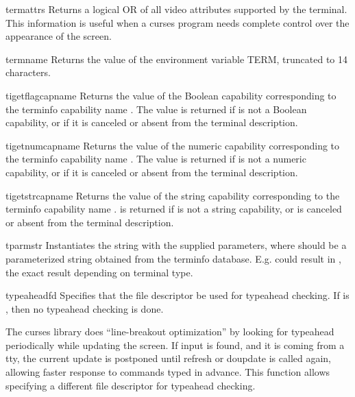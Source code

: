 \begin{funcdesc}{termattrs}{}
Returns a logical OR of all video attributes supported by the
terminal.  This information is useful when a curses program needs
complete control over the appearance of the screen.
\end{funcdesc}

\begin{funcdesc}{termname}{}
Returns the value of the environment variable TERM, truncated to 14
characters.
\end{funcdesc}

\begin{funcdesc}{tigetflag}{capname}
Returns the value of the Boolean capability corresponding to the
terminfo capability name .  The value  is
returned if  is not a Boolean capability, or  if
it is canceled or absent from the terminal description.
\end{funcdesc}

\begin{funcdesc}{tigetnum}{capname}
Returns the value of the numeric capability corresponding to the
terminfo capability name .  The value  is
returned if  is not a numeric capability, or  if
it is canceled or absent from the terminal description.  
\end{funcdesc}

\begin{funcdesc}{tigetstr}{capname}
Returns the value of the string capability corresponding to the
terminfo capability name .   is returned if
 is not a string capability, or is canceled or absent
from the terminal description.
\end{funcdesc}

\begin{funcdesc}{tparm}{str}
Instantiates the string  with the supplied parameters, where 
 should be a parameterized string obtained from the terminfo 
database.  E.g.  could result in 
\code{'\e{}033[6;4H'}, the exact result depending on terminal type.
\end{funcdesc}

\begin{funcdesc}{typeahead}{fd}
Specifies that the file descriptor  be used for typeahead
checking.  If  is , then no typeahead checking is
done.

The curses library does ``line-breakout optimization'' by looking for
typeahead periodically while updating the screen.  If input is found,
and it is coming from a tty, the current update is postponed until
refresh or doupdate is called again, allowing faster response to
commands typed in advance. This function allows specifying a different
file descriptor for typeahead checking.
\end{funcdesc}

